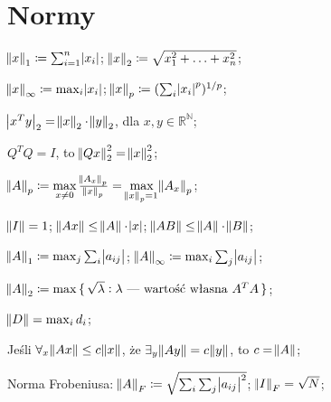 \section{Normy}


\entry
$\norm{x}_1 \coloneqq \sum^n_{i=1}\abs{x_i}$;
\entry
$\norm{x}_2 \coloneqq \sqrt{x_1^2+\ldots + x_n^2}$;

\entry
$\norm{x}_\infty \coloneqq \max_{i}\abs{x_i}$;
\entry
$\norm{x}_p \coloneqq (\sum_i\abs{x_i}^p)^{1/p}$;

\entry
$\abs{x^Ty}_2=\norm{x}_2\cdot\norm{y}_2$, dla $x,y\in\mathbb{R^N}$;

\entry
$Q^TQ=I$, to $\norm{Qx}^2_2=\norm{x}^2_2$;


\entry
$\norm{A}_p \coloneqq \max\limits_{x\neq 0} \frac{\norm{A_x}_p}{\norm{x}_p} = \max\limits_{\norm{x}_p = 1} \norm{A_x}_p$;

\entry
$\norm{I} = 1$;
\entry
$\norm{Ax} \leq \norm{A} \cdot \abs{x}$;
\entry
$\norm{AB} \leq \norm{A} \cdot \norm{B}$;

\entry
$\norm{A}_1 \coloneqq \max_j\sum_i\abs{a_{ij}}$;
\entry
$\norm{A}_\infty \coloneqq \max_i\sum_j\abs{a_{ij}}$;

\entry
$\norm{A}_2 \coloneqq \max\set{\sqrt{\lambda} : \lambda\text{ --- wartość własna } A^TA}$;

\entry
$\norm{D} = \max_i d_i$;

\entry
Jeśli $\forall_{x} \norm{Ax}\leq c\norm{x}$, że $\exists_y \norm{Ay} = c\norm{y}$, to $c=\norm{A}$;


\entry
Norma Frobeniusa: $\norm{A}_F \coloneqq \sqrt{\sum_i\sum_j\abs{a_{ij}}^2}$; $\norm{I}_F=\sqrt{N}$;


